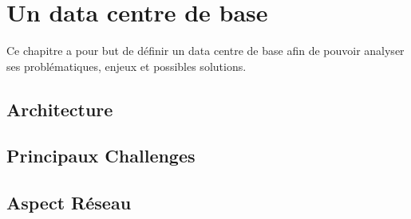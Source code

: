 \chapter{Un data centre de base}
\label{chap-1}

Ce chapitre a pour but de définir un data centre de base afin de pouvoir analyser ses problématiques, enjeux et possibles solutions.

\section{Architecture}


\section{Principaux Challenges}


\section{Aspect Réseau}